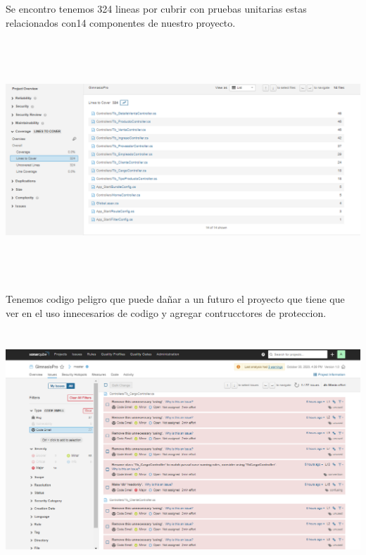 \documentclass[12pt,letterpaper]{article}
\begin{document}
Se encontro tenemos 324 lineas por cubrir con pruebas unitarias estas
relacionados con14 componentes de nuestro proyecto.
\begin{center}
    \includegraphics[width=18cm, height=9cm]{img/2scan5.png}  
\end{center}

Tenemos codigo peligro que puede dañar a un futuro el proyecto que tiene que ver 
en el uso innecesarios de codigo y agregar contrucctores de proteccion.
\begin{center}
    \includegraphics[width=18cm, height=9cm]{img/2scan6.png}  
\end{center}
\end{document}
